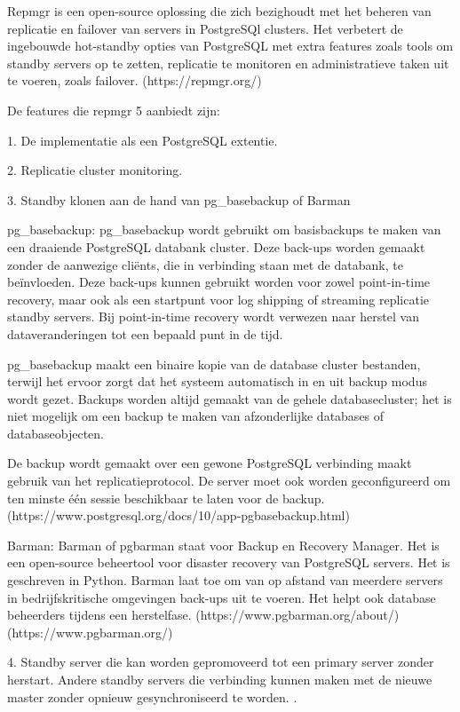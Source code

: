 Repmgr is een open-source oplossing die zich bezighoudt met het beheren van replicatie en failover van servers in PostgreSQl clusters. Het verbetert de ingebouwde hot-standby opties van PostgreSQL met extra features zoals tools om standby servers op te zetten, replicatie te monitoren en administratieve taken uit te voeren, zoals failover. (https://repmgr.org/)

De features die repmgr 5 aanbiedt zijn:

1. De implementatie als een PostgreSQL extentie.

2. Replicatie cluster monitoring.

3. Standby klonen aan de hand van pg\_basebackup of Barman

pg\_basebackup: pg\_basebackup wordt gebruikt om basisbackups te maken van een draaiende PostgreSQL databank cluster. Deze back-ups worden gemaakt zonder de aanwezige cliënts, die in verbinding staan met de databank, te beïnvloeden. Deze back-ups kunnen gebruikt worden voor zowel point-in-time recovery, maar ook als een startpunt voor log shipping of streaming replicatie standby servers. Bij point-in-time recovery wordt verwezen naar herstel van dataveranderingen tot een bepaald punt in de tijd. %

pg\_basebackup maakt een binaire kopie van de database cluster bestanden, terwijl het ervoor zorgt dat het systeem automatisch in en uit backup modus wordt gezet. Backups worden altijd gemaakt van de gehele databasecluster; het is niet mogelijk om een backup te maken van afzonderlijke databases of databaseobjecten. 

De backup wordt gemaakt over een gewone PostgreSQL verbinding maakt gebruik van het replicatieprotocol. De server moet ook worden geconfigureerd om ten minste één sessie beschikbaar te laten voor de backup. (https://www.postgresql.org/docs/10/app-pgbasebackup.html)

Barman: Barman of pgbarman staat voor Backup en Recovery Manager. Het is een open-source beheertool voor disaster recovery van PostgreSQL servers. Het is geschreven in Python. Barman laat toe om van op afstand van meerdere servers in bedrijfskritische omgevingen back-ups uit te voeren. Het helpt ook database beheerders tijdens een herstelfase. (https://www.pgbarman.org/about/)(https://www.pgbarman.org/)

4. Standby server die kan worden gepromoveerd tot een primary server zonder herstart. Andere standby servers die verbinding kunnen maken met de nieuwe master zonder opnieuw gesynchroniseerd te worden.
 .%

